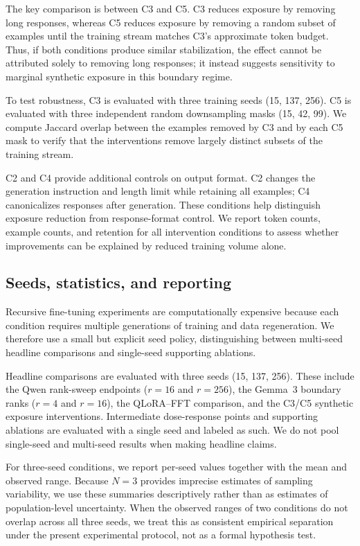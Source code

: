 \documentclass[a4paper,fleqn]{cas-dc}
\begin{document}
The key comparison is between C3 and C5. C3 reduces exposure by removing long
responses, whereas C5 reduces exposure by removing a random subset of examples
until the training stream matches C3's approximate token budget. Thus, if both
conditions produce similar stabilization, the effect cannot be attributed solely
to removing long responses; it instead suggests sensitivity to marginal
synthetic exposure in this boundary regime.

To test robustness, C3 is evaluated with three training seeds (15, 137, 256).
C5 is evaluated with three independent random downsampling masks (15, 42, 99).
We compute Jaccard overlap between the examples removed by C3 and by each C5
mask to verify that the interventions remove largely distinct subsets of the
training stream.

C2 and C4 provide additional controls on output format. C2 changes the generation
instruction and length limit while retaining all examples; C4 canonicalizes
responses after generation. These conditions help distinguish exposure reduction
from response-format control. We report token counts, example counts, and
retention for all intervention conditions to assess whether improvements can be
explained by reduced training volume alone.

\subsection{Seeds, statistics, and reporting}\label{sec:statistics}

Recursive fine-tuning experiments are computationally expensive because each
condition requires multiple generations of training and data regeneration. We
therefore use a small but explicit seed policy, distinguishing between
multi-seed headline comparisons and single-seed supporting ablations.

Headline comparisons are evaluated with three seeds (15, 137, 256). These
include the Qwen rank-sweep endpoints ($r=16$ and $r=256$), the Gemma~3 boundary
ranks ($r=4$ and $r=16$), the QLoRA--FFT comparison, and the C3/C5 synthetic
exposure interventions. Intermediate dose-response points and supporting
ablations are evaluated with a single seed and labeled as such. We do not pool
single-seed and multi-seed results when making headline claims.

For three-seed conditions, we report per-seed values together with the mean and
observed range. Because $N=3$ provides imprecise estimates of sampling
variability, we use these summaries descriptively rather than as estimates of
population-level uncertainty. When the observed ranges of two conditions do not
overlap across all three seeds, we treat this as consistent empirical separation
under the present experimental protocol, not as a formal hypothesis test.
\end{document}
